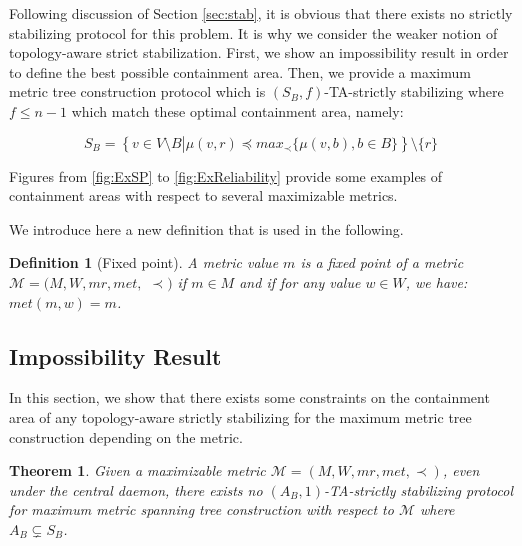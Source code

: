 \documentclass[11pt]{article}
\newtheorem{theo}{Theorem}
\newtheorem{defi}{Definition}
\newenvironment{theorem}[1]{\vspace{-0.25cm}\begin{theo}#1}{\end{theo}\vspace{-0.3cm}}
\newenvironment{definition}[1]{\vspace{-0.25cm}\begin{defi}#1}{\end{defi}\vspace{-0.3cm}}
\begin{document}
Following discussion of Section \ref{sec:stab}, it is obvious that there exists no strictly stabilizing protocol for this problem. It is why we consider the weaker notion of topology-aware strict stabilization. First, we show an impossibility result in order to define the best possible containment area. Then, we provide a maximum metric tree construction protocol which is $(S_{B},f)$-TA-strictly stabilizing where $f\leq n-1$ which match these optimal containment area, namely:

\[S_{B}=\left\{v\in V\setminus B\left|\mu(v,r)\preceq max_\prec\{\mu(v,b),b\in B\}\right.\right\}\setminus\{r\}\]

Figures from \ref{fig:ExSP} to \ref{fig:ExReliability} provide some examples of containment areas with respect to several maximizable metrics.

We introduce here a new definition that is used in the following.

\begin{definition}[Fixed point]
A metric value $m$ is a \emph{fixed point} of a metric $\mathcal{M}=(M,W,mr,met,$ $\prec)$ if $m\in M$ and if for any value $w\in W$, we have: $met(m,w)=m$.
\end{definition}

\subsection{Impossibility Result}

In this section, we show that there exists some constraints on the containment area of any topology-aware strictly stabilizing for the maximum metric tree construction depending on the metric.

\begin{theorem}\label{th:impTAstrict}
Given a maximizable metric $\mathcal{M}=(M,W,mr,met,\prec)$, even under the central daemon, there exists no $(A_B,1)$-TA-strictly stabilizing protocol for maximum metric spanning tree construction with respect to $\mathcal{M}$ where $A_B\varsubsetneq S_B$.
\end{theorem}
\end{document}
